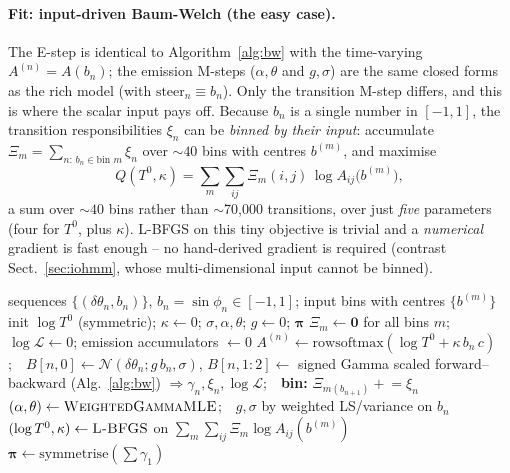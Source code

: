 \documentclass[11pt]{article}
\begin{document}
\paragraph{Fit: input-driven Baum-Welch (the easy case).}
The E-step is identical to Algorithm~\ref{alg:bw} with the time-varying
$A^{(n)}=A(b_n)$; the emission M-steps ($\alpha,\theta$ and $g,\sigma$) are the
same closed forms as the rich model (with $\text{steer}_n\equiv b_n$). Only the
transition M-step differs, and this is where the scalar input pays off. Because
$b_n$ is a single number in $[-1,1]$, the transition responsibilities $\xi_n$ can
be \emph{binned by their input}: accumulate
$\Xi_m=\sum_{n:\,b_n\in\text{bin }m}\xi_n$ over $\sim\!40$ bins with centres
$b^{(m)}$, and maximise
\begin{equation}
Q(T^0,\kappa)=\sum_m\sum_{ij}\Xi_m(i,j)\,\log A_{ij}\big(b^{(m)}\big),
\end{equation}
a sum over $\sim\!40$ bins rather than $\sim$70{,}000 transitions, over just
\emph{five} parameters (four for $T^0$, plus $\kappa$). L-BFGS on this tiny
objective is trivial and a \emph{numerical} gradient is fast enough -- no
hand-derived gradient is required (contrast Sect.~\ref{sec:iohmm}, whose
multi-dimensional input cannot be binned).

\begin{algorithm}[h]
\caption{Input-driven Baum-Welch, scalar centroid model}\label{alg:simplestim}
\begin{algorithmic}[1]
\Require sequences $\{(\delta\theta_n,b_n)\}$, $b_n=\sin\phi_n\in[-1,1]$; input bins with centres $\{b^{(m)}\}$
\State init $\log T^0$ (symmetric); $\kappa\gets0$; $\sigma,\alpha,\theta$; $g\gets0$; $\boldsymbol\pi$
\Repeat
  \State $\Xi_m\gets\mathbf 0$ for all bins $m$; $\log\mathcal L\gets0$; emission accumulators $\gets0$
    \State $A^{(n)}\gets\mathrm{rowsoftmax}(\log T^0+\kappa\,b_n\,c)$;\ \ $B[n,0]\gets\mathcal N(\delta\theta_n;g\,b_n,\sigma)$, $B[n,1{:}2]\gets$ signed Gamma
    \State scaled forward--backward (Alg.~\ref{alg:bw}) $\Rightarrow\gamma_n,\xi_n,\log\mathcal L$;\ \ \textbf{bin:} $\Xi_{m(b_{n+1})}\mathrel{+}=\xi_n$
  \EndFor
  \State $(\alpha,\theta)\gets\textsc{WeightedGammaMLE}$;\ \ $g,\sigma$ by weighted LS/variance on $b_n$
  \State $(\log T^0,\kappa)\gets\textsc{L-BFGS}$ on $\sum_m\sum_{ij}\Xi_m\log A_{ij}(b^{(m)})$
  \State $\boldsymbol\pi\gets\mathrm{symmetrise}(\textstyle\sum\gamma_1)$
\end{algorithmic}
\end{algorithm}
\end{document}

